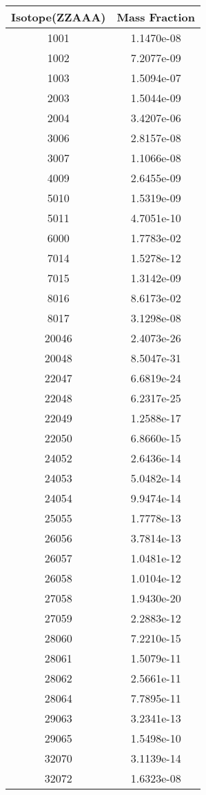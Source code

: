 \begin{table}[h!]
\centering
\begin{tabular}{|| c || c |}
\hline
Isotope(ZZAAA) & Mass Fraction \\
\hline \hline

1001 & 1.1470e-08 \\
1002 & 7.2077e-09 \\
1003 & 1.5094e-07 \\
2003 & 1.5044e-09 \\
2004 & 3.4207e-06 \\
3006 & 2.8157e-08 \\
3007 & 1.1066e-08 \\
4009 & 2.6455e-09 \\
5010 & 1.5319e-09 \\
5011 & 4.7051e-10 \\
6000 & 1.7783e-02 \\
7014 & 1.5278e-12 \\
7015 & 1.3142e-09 \\
8016 & 8.6173e-02 \\
8017 & 3.1298e-08 \\
20046 & 2.4073e-26 \\
20048 & 8.5047e-31 \\
22047 & 6.6819e-24 \\
22048 & 6.2317e-25 \\
22049 & 1.2588e-17 \\
22050 & 6.8660e-15 \\
24052 & 2.6436e-14 \\
24053 & 5.0482e-14 \\
24054 & 9.9474e-14 \\
25055 & 1.7778e-13 \\
26056 & 3.7814e-13 \\
26057 & 1.0481e-12 \\
26058 & 1.0104e-12 \\
27058 & 1.9430e-20 \\
27059 & 2.2883e-12 \\
28060 & 7.2210e-15 \\
28061 & 1.5079e-11 \\
28062 & 2.5661e-11 \\
28064 & 7.7895e-11 \\
29063 & 3.2341e-13 \\
29065 & 1.5498e-10 \\
32070 & 3.1139e-14 \\
32072 & 1.6323e-08 \\

\end{tabular}
\end{table}
